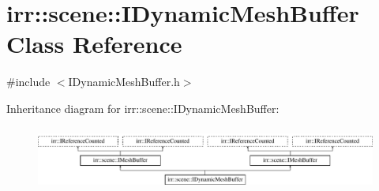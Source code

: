 \hypertarget{classirr_1_1scene_1_1IDynamicMeshBuffer}{}\section{irr\+:\+:scene\+:\+:I\+Dynamic\+Mesh\+Buffer Class Reference}
\label{classirr_1_1scene_1_1IDynamicMeshBuffer}


{\ttfamily \#include $<$I\+Dynamic\+Mesh\+Buffer.\+h$>$}

Inheritance diagram for irr\+:\+:scene\+:\+:I\+Dynamic\+Mesh\+Buffer\+:\begin{figure}[H]
\begin{center}
\leavevmode
\includegraphics[height=2.131979cm]{classirr_1_1scene_1_1IDynamicMeshBuffer}
\end{center}
\end{figure}
